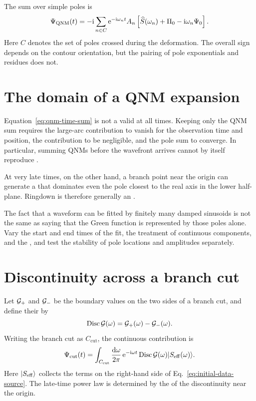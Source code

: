 The sum over simple poles is
\begin{equation}
\Psi_{\mathrm{QNM}}(t)
=
-\mathrm{i}
\sum_{n\in C}
\mathrm{e}^{-\mathrm{i}\omega_n t}
A_n
\left[
\widehat S(\omega_n)+\Pi_0-\mathrm{i}\omega_n\Psi_0
\right].
\label{eq:qnm-time-sum}
\end{equation}
Here $C$ denotes the set of poles crossed during the deformation. The overall sign depends on the contour orientation, but the pairing of pole exponentials and residues does not.

\section{The domain of a QNM expansion}

Equation~\eqref{eq:qnm-time-sum} is not a  valid at all times. Keeping only the QNM sum requires the large-arc contribution to vanish for the observation time and position, the  contribution to be negligible, and the pole sum to converge. In particular, summing QNMs before the wavefront arrives cannot by itself reproduce .

At very late times, on the other hand, a branch point near the origin can generate a  that dominates even the pole closest to the real axis in the lower half-plane. Ringdown is therefore generally an .

\begin{warningbox}
The fact that a waveform can be fitted by finitely many damped sinusoids is not the same as saying that the Green function is represented by those poles alone. Vary the start and end times of the fit, the treatment of continuous components, and the , and test the stability of pole locations and amplitudes separately.
\end{warningbox}

\section{Discontinuity across a branch cut}

Let $\mathcal{G}_+$ and $\mathcal{G}_-$ be the boundary values on the two sides of a branch cut, and define their  by
\begin{equation}
\operatorname{Disc}\mathcal{G}(\omega)
=
\mathcal{G}_+(\omega)-\mathcal{G}_-(\omega).
\label{eq:green-discontinuity}
\end{equation}
Writing the branch cut as $C_{\mathrm{cut}}$, the continuous contribution is
\begin{equation}
\Psi_{\mathrm{cut}}(t)
=
\int_{C_{\mathrm{cut}}}
\frac{\mathrm{d}\omega}{2\pi}\,
\mathrm{e}^{-\mathrm{i}\omega t}
\operatorname{Disc}\mathcal{G}(\omega)
\lvert S_{\mathrm{eff}}(\omega) \rangle.
\label{eq:cut-time-response}
\end{equation}
Here $\lvert S_{\mathrm{eff}} \rangle$ collects the terms on the right-hand side of Eq.~\eqref{eq:initial-data-source}. The late-time power law is determined by the  of the discontinuity near the origin.

